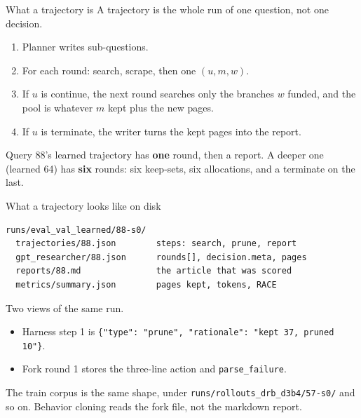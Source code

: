 \documentclass[aspectratio=169,11pt]{beamer}
\begin{document}
\begin{frame}{What a trajectory is}
  A trajectory is the whole run of one question, not one decision.
  \vspace{0.3em}
  \begin{enumerate}
    \item Planner writes sub-questions.
    \item For each round: search, scrape, then one $(u, m, w)$.
    \item If $u$ is continue, the next round searches only the branches $w$ funded, and the pool is whatever $m$ kept plus the new pages.
    \item If $u$ is terminate, the writer turns the kept pages into the report.
  \end{enumerate}
  \vspace{0.35em}
  Query 88's learned trajectory has \textbf{one} round, then a report. A deeper one (learned 64) has \textbf{six} rounds: six keep-sets, six allocations, and a terminate on the last.
\end{frame}

\begin{frame}[fragile]{What a trajectory looks like on disk}
  \begin{verbatim}
runs/eval_val_learned/88-s0/
  trajectories/88.json        steps: search, prune, report
  gpt_researcher/88.json      rounds[], decision.meta, pages
  reports/88.md               the article that was scored
  metrics/summary.json        pages kept, tokens, RACE
  \end{verbatim}
  \vspace{0.25em}
  Two views of the same run.
  \begin{itemize}
    \item Harness step 1 is \texttt{\{"type": "prune", "rationale": "kept 37, pruned 10"\}}.
    \item Fork round 1 stores the three-line action and \texttt{parse\_failure}.
  \end{itemize}
  \vspace{0.2em}
  The train corpus is the same shape, under \texttt{runs/rollouts\_drb\_d3b4/57-s0/} and so on. Behavior cloning reads the fork file, not the markdown report.
\end{frame}
\end{document}
